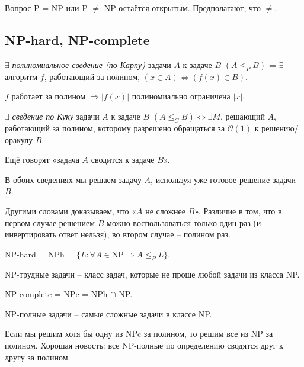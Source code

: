 \begin{remark}
    Вопрос P = NP или P $\neq$ NP остаётся открытым. Предполагают, что $\neq$.
\end{remark}

\subsection{NP-hard, NP-complete}

\begin{definition}
    $\exists$ \textit{полиномиальное сведение (по Карпу)} задачи $A$ к задаче $B$ $(A \leq_P B) \Leftrightarrow \exists$ алгоритм $f$, работающий за полином, $(x\in A) \Leftrightarrow (f(x) \in B)$.
\end{definition}

\begin{remark}
    $f$ работает за полином $\Rightarrow |f(x)|$ полиномиально ограничена $|x|$.
\end{remark}

\begin{definition}
    $\exists$ \textit{сведение по Куку} задачи $A$ к задаче $B$ $(A \leq_C B) \Leftrightarrow \exists M$, решающий $A$, работающий за полином, которому разрешено обращаться за $\mathcal{O}(1)$ к решению/оракулу $B$.
\end{definition}

Ещё говорят «задача $A$ сводится к задаче $B$».

В обоих сведениях мы решаем задачу $A$, используя уже готовое решение задачи $B$.

Другими словами доказываем, что «$A$ не сложнее $B$». Различие в том, что в первом случае решением $B$ можно воспользоваться только один раз (и инвертировать ответ нельзя), во втором случае – полином раз.

\begin{definition}
    NP-hard = NPh = $\{L:\forall A\in \text{NP}\Rightarrow A\leq_P L\}$.
\end{definition}

NP-трудные задачи – класс задач, которые не проще любой задачи из класса NP.

\begin{definition}
    NP-complete = NPc = NPh $\cap$ NP.
\end{definition}

NP-полные задачи – самые сложные задачи в классе NP.

Если мы решим хотя бы одну из NPc за полином, то решим все из NP за полином. Хорошая новость: все NP-полные по определению сводятся друг к другу за полином.

